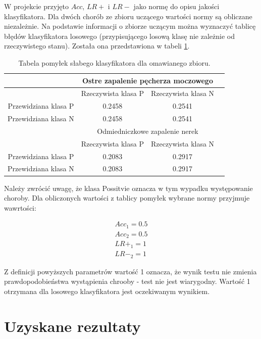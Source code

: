 \documentclass{article}
\begin{document}
W projekcie przyjęto $Acc$, $LR+$ i $LR-$ jako normę do opisu jakości klasyfikatora. Dla dwóch chorób ze zbioru uczącego wartości normy są obliczane niezależnie. Na podstawie informacji o zbiorze uczącym można wyznaczyć tablicę błędów klasyfikatora losowego (przypisującego losową klasę nie zależnie od rzeczywistego stanu). Została ona przedstawiona w tabeli \ref{conf matrix on traning set}.

\begin{table}
\caption{Tabela pomyłek słabego klasyfikatora dla omawianego zbioru.}
\label{conf matrix on traning set}
\centering
\begin{tabular}{|c|c|c|c|}
  \hline
   & \multicolumn{2}{c}{Ostre zapalenie pęcherza moczowego}  \\
  \hline
   & Rzeczywista klasa P & Rzeczywista klasa N \\
  \hline
  Przewidziana klasa P & 0.2458 & 0.2541 \\
  \hline
  Przewidziana klasa N & 0.2458 & 0.2541 \\
  \hline
  & \multicolumn{2}{c}{Odmiedniczkowe zapalenie nerek} \\
  \hline
  & Rzeczywista klasa P & Rzeczywista klasa N \\
  \hline
  Przewidziana klasa P & 0.2083 & 0.2917 \\
  \hline
  Przewidziana klasa N & 0.2083 & 0.2917 \\
  \hline
\end{tabular}
\end{table}

Należy zwrócić uwagę, że klasa Possitvie oznacza w tym wypadku występowanie choroby. Dla obliczonych wartości  z tablicy pomyłek wybrane normy przyjmuje wawrtości:

\begin{equation}
\begin{aligned}
  Acc_1 = 0.5 \\
  Acc_2 = 0.5 \\
  LR+_1 = 1 \\
  LR-_2 = 1
\end{aligned}
\end{equation}

Z definicji powyższych parametrów wartość 1 oznacza, że wynik testu nie zmienia prawdopodobieństwa wystąpienia chrooby - test nie jest wiarygodny. Wartość 1 otrzymana dla losowego klasyfikatora jest oczekiwanym wynikiem.

\newpage
\section{Uzyskane rezultaty}
\end{document}
